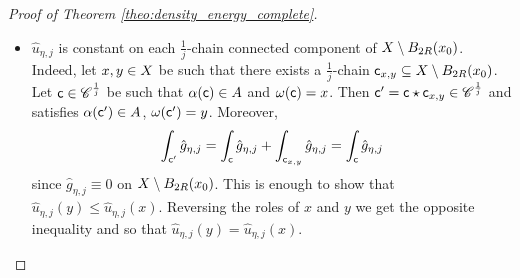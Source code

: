 \documentclass[12pt]{amsart}
\newcommand{\X}{{\rm X}}
\theoremstyle{definition}
\newcommand{\sfc}{{\sf c}}
\newcommand{\Chain}[1]{\mathscr{C}^{#1}}
\begin{document}
\begin{proof}[Proof of Theorem \ref{theo:density_energy_complete}]
\begin{itemize}
            \item[(e)] $\hat{u}_{\eta,j}$ is constant on each $\frac{1}{j}$-chain connected component of $\X \setminus B_{2R}(x_0)$. Indeed, let $x,y \in \X$ be such that there exists a $\frac{1}{j}$-chain $\sfc_{x,y} \subseteq \X \setminus B_{2R}(x_0)$. Let $\sfc \in \Chain{\frac{1}{j}}$ be such that $\alpha(\sfc) \in A$ and $\omega(\sfc) = x$. Then $\sfc' = \sfc \star \sfc_{x,y} \in \Chain{\frac{1}{j}}$ and satisfies $\alpha(\sfc') \in A$, $\omega(\sfc') = y$. Moreover, $$\int_{\sfc'} \hat{g}_{\eta,j} = \int_{\sfc} \hat{g}_{\eta,j} + \int_{\sfc_{x,y}} \hat{g}_{\eta,j} = \int_{\sfc} \hat{g}_{\eta,j}$$
            since $\hat{g}_{\eta,j} \equiv 0$ on $\X \setminus B_{2R}(x_0)$. This is enough to show that $\hat{u}_{\eta,j}(y) \le \hat{u}_{\eta,j}(x)$. Reversing the roles of $x$ and $y$ we get the opposite inequality and so that $\hat{u}_{\eta,j}(y) = \hat{u}_{\eta,j}(x)$.
        \end{itemize}
    \vspace{2mm}


\end{proof}
\end{document}
